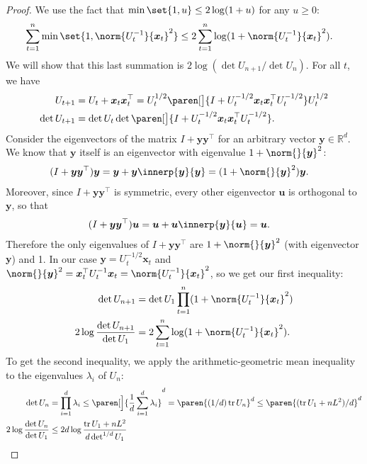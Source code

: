 \documentclass{article}
\renewcommand{\vec}[1]{\bm{#1}}
\newcommand{\inv}[1]{#1^{-1}}
\newcommand{\Real}{\mathds{R}}
\newcommand{\tr}{\operatorname{tr}}
\renewcommand{\det}{\operatorname{det}}
\DeclarePairedDelimiter{\paren}()
\providecommand\transp{\top}
\let\transpsymbol\transp
\renewcommand{\transp}[1]{#1^\transpsymbol}
\begin{document}
\begin{proof}
  We use the fact that $\min\set{1, u} \le 2\log(1+u)$ for any
  $u \ge 0$:
  \begin{align*}
    \sum_{t=1}^n\min\set{1, \norm{\inv{U_t}}{\vec x_t}^2}
    &\le 2 \sum_{t=1}^n \log(1 + \norm{\inv{U_t}}{\vec x_t}^2).
  \end{align*}
  We will show that this last summation is $2\log(\det U_{n+1}/\det
  U_n)$.  For all $t$, we have
  \begin{align*}
    U_{t+1} &= U_t + \vec x_t \transp{\vec x_t}
             = U_t^{1/2}
             \paren[\big]{I + U_t^{-1/2} \vec x_t \transp{\vec x_t} U_t^{-1/2}}
             U_t^{1/2} \\
    \det U_{t+1} &=\det U_t
                  \det\paren[\big]{I +
                  U_t^{-1/2} \vec x_t \transp{\vec x_t}
                  U_t^{-1/2}}.
  \end{align*}
  Consider the eigenvectors of the matrix $I + \vec y \transp{\vec y}$
  for an arbitrary vector $\vec y \in \Real^d$.  We know that $\vec y$
  itself is an eigenvector with eigenvalue $1+\norm{}{\vec y}^2$:
  \begin{align*}
    (I + \vec y \transp{\vec y}) \vec y
    &= \vec y + \vec y \innerp{\vec y}{\vec y} = (1+\norm{}{\vec y}^2)\vec y.
  \end{align*}
  Moreover, since $I + \vec y \transp{\vec y}$ is symmetric, every
  other eigenvector $\vec u$ is orthogonal to $\vec y$, so that
  \begin{align*}
    (I + \vec y \transp{\vec y}) \vec u
    &= \vec u + \vec u \innerp{\vec y}{\vec u} = \vec u.
  \end{align*}
  Therefore the only eigenvalues of $I + \vec y \transp{\vec y}$ are
  $1+\norm{}{\vec y}^2$ (with eigenvector $\vec y$) and 1.  In our
  case $\vec y = U_t^{-1/2} \vec x_t$ and
  $\norm{}{\vec y}^2 = \transp{\vec x_t} \inv{U_t} \vec x_t =
  \norm{\inv{U_t}}{\vec x_t}^2$, so we get our first inequality:
  \begin{align*}
    \det U_{n+1} &= \det U_1 \prod_{t=1}^n(1 + \norm{\inv{U_t}}{\vec x_t}^2) \\
    2\log\frac{\det U_{n+1}}{\det U_1}
            &= 2\sum_{t=1}^n\log(1+\norm{\inv{U_t}}{\vec x_t}^2).
  \end{align*}
  To get the second inequality, we apply the arithmetic-geometric
  mean inequality to the eigenvalues $\lambda_i$ of $U_n$:
  \begin{align*}
    \det U_n &= \prod_{i=1}^d \lambda_i
              \le \paren[\Big]{\frac{1}{d} \sum_{i=1}^d \lambda_i}^d
              = \paren{(1/d)\tr U_n}^d
              \le \paren{(\tr U_1 + nL^2)/d}^d \\
    2\log\frac{\det U_n}{\det U_1}
            &\le 2d \log\frac{\tr U_1 + nL^2}{d\det^{1/d}U_1}
              \qedhere
  \end{align*}
\end{proof}
\end{document}
